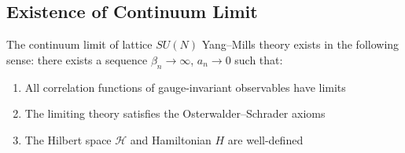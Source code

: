 \subsection{Existence of Continuum Limit}

\begin{theorem}
\label{thm:continuum-exists}
The continuum limit of lattice $SU(N)$ Yang--Mills theory exists in the 
following sense: there exists a sequence $\beta_n \to \infty$, $a_n \to 0$ 
such that:
\begin{enumerate}[label=(\roman*)]
\item All correlation functions of gauge-invariant observables have limits
\item The limiting theory satisfies the Osterwalder--Schrader axioms
\item The Hilbert space $\mathcal{H}$ and Hamiltonian $H$ are well-defined
\end{enumerate}
\end{theorem}

